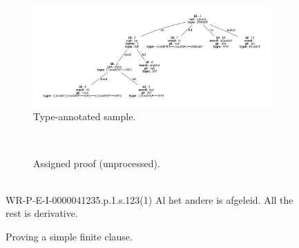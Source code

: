 \begin{figure}
	\begin{subfigure}{1\textwidth}
		\includegraphics[width=1\textwidth, trim={1.5cm 1.5cm 1.5cm 1.5cm}]{./prebuilt/simple_extraction.pdf}
		\caption{Type-annotated sample.}
	\end{subfigure}\\[\midsep]
	\begin{subfigure}{1\textwidth}
		\caption{Assigned proof (unprocessed).}
	\end{subfigure}\\[\midsep]
	\aethelcap
		{WR-P-E-I-0000041235.p.1.s.123(1)}
		{Al het andere is afgeleid.}
		{All the rest is derivative.}
		{}
	\caption{Proving a simple finite clause.}
	\label{figure:simple_extraction}
\end{figure}
%

